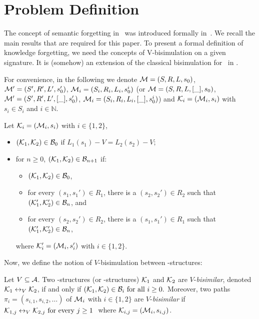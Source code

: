 \documentclass{article}
\begin{document}
\section{Problem Definition}
The concept of semantic forgetting in \CTL\ was introduced formally in~\cite{renyansfirstpaper}. We recall the main results that are required for this paper.
To present a formal definition of knowledge forgetting, we need the concepts of V-bisimulation on a given signature. It is (somehow) an extension of the classical bisimulation for \CTL\ in \cite{Baier:PMC:2008}.

For convenience, in the following we denote ${\cal M}=(S, R, L, s_0)$,
${\cal M}'=(S',R',L',s_0')$, ${\cal M}_i=(S_i, R_i,L_i, s_0^i)$ (or ${\cal M}=(S, R, L, [\_], s_0)$,
${\cal M}'=(S',R',L', [\_],s_0')$, ${\cal M}_i=(S_i, R_i,L_i, [\_], s_0^i)$) and ${\cal K}_i=({\cal M}_i, s_i)$ with $s_i \in S_i$
and $i \in \mathbb{N}$.

Let
${\cal K}_i=({\cal M}_i,s_i)$ with $i\in\{1,2\}$,
\begin{itemize}
  \item $({\cal K}_1,{\cal K}_2)\in{\cal B}_0$ if $L_1(s_1)- V=L_2(s_2)- V$;  %
  \item for $n\ge 0$, $({\cal K}_1,{\cal K}_2)\in{\cal B}_{n+1}$ if:
  \begin{itemize}
    \item $({\cal K}_1,{\cal K}_2)\in{\cal B}_0$,
    \item for every $(s_1,s_1')\in R_1$, there is a $(s_2,s_2')\in R_2$
    such that $({\cal K}_1',{\cal K}_2')\in {\cal B}_n$, and
    \item for every $(s_2,s_2')\in R_2$, there is a $(s_1,s_1')\in R_1$
    such that $({\cal K}_1',{\cal K}_2')\in {\cal B}_n$,
  \end{itemize}
  where ${\cal K}_i'=({\cal M}_i,s_i')$ with $i\in\{1,2\}$.
\end{itemize}

Now, we define the notion of $V$-bisimulation between \MPK-structures:
\begin{definition}[$V$-bisimulation] %
  \label{def:V-bisimulation}
   Let $V\subseteq\cal A$. Two \MPK-structures (or \Ind-structures) ${\cal K}_1$ and ${\cal K}_2$ are $V$-{\em bisimilar},  denoted ${\cal K}_1 \leftrightarrow_V {\cal K}_2$,
 if and only if $({\cal K}_1,{\cal K}_2)\in {{\cal B}_i}\mbox{ for all }i\ge 0.$ Moreover, two paths $\pi_i=(s_{i,1},s_{i,2},\ldots)$ of ${\cal M}_i$ with $i\in \{1,2\}$
 are $V$-{\em bisimilar} if
$ {\cal K}_{1,j} \leftrightarrow_V {\cal K}_{2,j}\mbox { for every $j\ge 1$ }$
 where ${\cal K}_{i,j}=({\cal M}_i,s_{i,j})$.
\end{definition}
\end{document}
